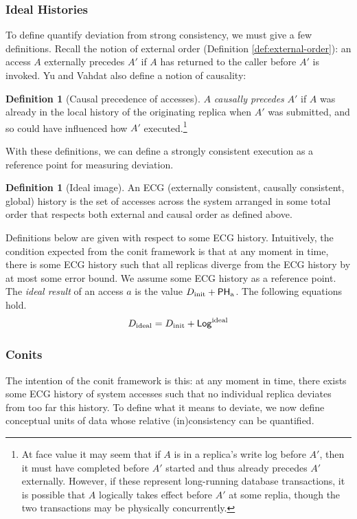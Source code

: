 \documentclass[]             %
{NASA}                       %
\theoremstyle{definition}
\newtheorem{definition}[theorem]{Definition}
\begin{document}
\subsubsection{Ideal Histories}
To define quantify deviation from strong consistency, we must give a
few definitions. Recall the notion of external order (Definition
\ref{def:external-order}): an access $A$ externally precedes $A'$ if
$A$ has returned to the caller before $A'$ is invoked. Yu and Vahdat
also define a notion of causality:
\begin{definition}[Causal precedence of accesses]
  \label{def:conit-causal-precedence}
  $A$ \emph{causally precedes} $A'$ if $A$ was already in the local
  history of the originating replica when $A'$ was submitted, and so
  could have influenced how $A'$ executed.\footnote{At face value it
    may seem that if $A$ is in a replica's write log before $A'$, then
    it must have completed before $A'$ started and thus already
    precedes $A'$ externally. However, if these represent long-running
    database transactions, it is possible that $A$ logically takes
    effect before $A'$ at some replia, though the two transactions may
    be physically concurrently.}
\end{definition}

With these definitions, we can define a strongly consistent execution
as a reference point for measuring deviation.

\begin{definition}[Ideal image]
  An ECG (externally consistent, causally consistent, global) history
  is the set of accesses across the system arranged in some total
  order that respects both external and causal order as defined above.
\end{definition}
Definitions below are given with respect to some ECG
history. Intuitively, the condition expected from the conit framework
is that at any moment in time, there is some ECG history such that all
replicas diverge from the ECG history by at most some error bound.
 We assume some ECG history as a reference
point. The \emph{ideal result} of an access $a$ is the value
$D_\textrm{init} + \mathsf{PH}_\textrm{a}$.  The following equations hold.
\begin{gather}
  D_{\textrm{ideal}} = D_\textrm{init} + \mathsf{Log}^{\textrm{ideal}} \label{eq:conit-Dideal}
\end{gather}



\subsubsection{Conits}
The intention of the conit framework is this: at any moment in time,
there exists some ECG history of system accesses such that no
individual replica deviates from too far this history. To define what
it means to deviate, we now define conceptual units of data whose
relative (in)consistency can be quantified.
\end{document}
